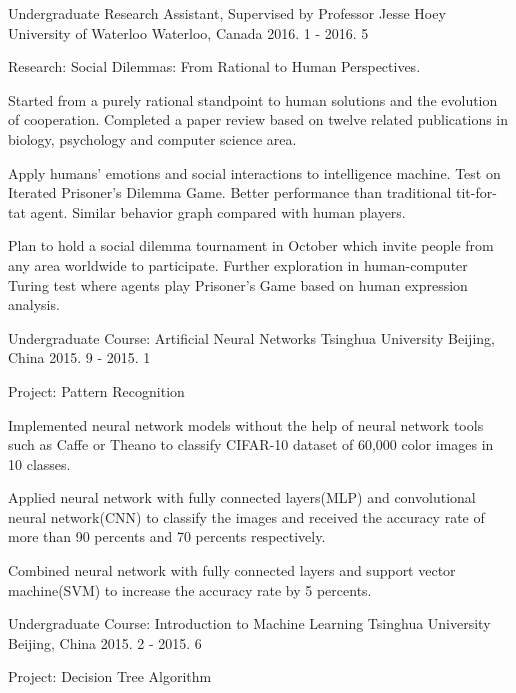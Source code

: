 \begin{cventries}
  \cventry
    {Undergraduate Research Assistant, Supervised by Professor Jesse Hoey}
    {University of Waterloo}
    {Waterloo, Canada}
    {2016. 1 - 2016. 5}
    {
      \begin{cvitems}
        \item {Research: Social Dilemmas: From Rational to Human Perspectives.}
        \item {Started from a purely rational standpoint to human solutions and the evolution of cooperation. Completed a paper review based on twelve related publications in biology, psychology and computer science area.}
        \item {Apply humans' emotions and social interactions to intelligence machine. Test on Iterated Prisoner's Dilemma Game. Better performance than traditional tit-for-tat agent. Similar behavior graph compared with human players.}
        \item {Plan to hold a social dilemma tournament in October which invite people from any area worldwide to participate. Further exploration in human-computer Turing test where agents play Prisoner's Game based on human expression analysis.}
      \end{cvitems}
    }
  \cventry
    {Undergraduate Course: Artificial Neural Networks}
    {Tsinghua University}
    {Beijing, China}
    {2015. 9 - 2015. 1}
    {
      \begin{cvitems}
        \item{Project: Pattern Recognition}
        \item{Implemented neural network models without the help of neural network tools such as Caffe or Theano to classify CIFAR-10 dataset of 60,000 color images in 10 classes.}
        \item{Applied neural network with fully connected layers(MLP) and convolutional neural network(CNN) to classify the images and received the accuracy rate of more than 90 percents and 70 percents respectively.}
        \item{Combined neural network with fully connected layers and support vector machine(SVM) to increase the accuracy rate by 5 percents.}
      \end{cvitems}
    }
  \cventry
    {Undergraduate Course: Introduction to Machine Learning}
    {Tsinghua University}
    {Beijing, China}
    {2015. 2 - 2015. 6}
    {
      \begin{cvitems}
        \item{Project: Decision Tree Algorithm}

\end{cvitems}}
\end{cventries}
